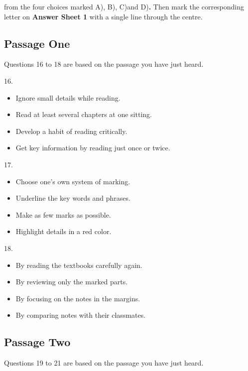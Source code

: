 \documentclass[UTF8,11pt]{ctexart}
\begin{document}
from the four choices marked A), B), C)and D)\textbf{.} Then mark the corresponding letter on\textbf{ Answer Sheet 1} with a single line through the centre.


\subsection*{Passage One}


Questions 16 to 18 are based on the passage you have just heard.


16.


\begin{itemize}[leftmargin=2em,itemsep=.2em,topsep=.4em]\item[A.] Ignore small details while reading.
\item[B.] Read at least several chapters at one sitting.
\item[C.] Develop a habit of reading critically.
\item[D.] Get key information by reading just once or twice.
\end{itemize}

17.


\begin{itemize}[leftmargin=2em,itemsep=.2em,topsep=.4em]\item[A.] Choose one’s own system of marking.
\item[B.] Underline the key words and phrases.
\item[C.] Make as few marks as possible.
\item[D.] Highlight details in a red color.
\end{itemize}

18.


\begin{itemize}[leftmargin=2em,itemsep=.2em,topsep=.4em]\item[A.] By reading the textbooks carefully again.
\item[B.] By reviewing only the marked parts.
\item[C.] By focusing on the notes in the margins.
\item[D.] By comparing notes with their classmates.
\end{itemize}

\subsection*{Passage Two}


Questions 19 to 21 are based on the passage you have just heard.
\end{document}
